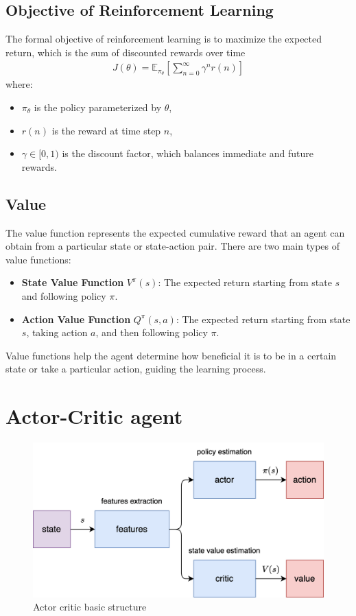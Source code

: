 \documentclass[12pt,twoside,onecolumn,openany,extrafontsizes,dvipsnames]{memoir}
\begin{document}
    \subsection{Objective of Reinforcement Learning}
    The formal objective of reinforcement learning is to maximize the expected return, which is the sum of discounted rewards over time
    \begin{align}
        J(\theta) = \mathbb{E}_{\pi_{\theta}} \left[ \sum_{n=0}^{\infty} \gamma^n r(n) \right]
    \end{align}
    where:
    \begin{itemize}
        \item \( \pi_{\theta} \) is the policy parameterized by \( \theta \),
        \item \( r(n) \) is the reward at time step \( n \),
        \item \( \gamma \in [0, 1) \) is the discount factor, which balances immediate and future rewards.
    \end{itemize}

    \subsection{Value}
    The value function represents the expected cumulative reward that an agent can obtain from a particular state or state-action pair. 
    There are two main types of value functions:
    \begin{itemize}
        \item \textbf{State Value Function} \( V^\pi(s) \): The expected return starting from state \( s \) and following policy \( \pi \).
        \item \textbf{Action Value Function} \( Q^\pi(s, a) \): The expected return starting from state \( s \), taking action \( a \), and then following policy \( \pi \).
    \end{itemize}
    Value functions help the agent determine how beneficial it is to be in a certain state or take a particular action,
    guiding the learning process.

    \newpage
    \section{Actor-Critic agent}

    \begin{figure}[!htb]
        \centering
        \includegraphics[scale=0.8]{../diagrams/reinforcement_learning/rl-actor_critic.png}
        \caption{Actor critic basic structure}
        \label{fig:actor_critic}
    \end{figure}
\end{document}
